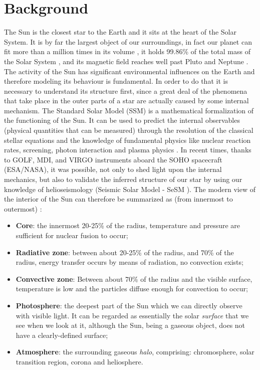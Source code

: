 \chapter{Background}
\label{capitolo2}
\thispagestyle{empty}


\noindent The Sun is the closest star to the Earth and it sits at the heart of the Solar System. It is by far the largest object of our surroundings, in fact our planet can fit more than a million times in its volume \cite{Laclare1996}, it holds 99.86\% of the total mass of the Solar System \cite{astro-const}, and its magnetic field reaches well past Pluto and Neptune \cite{nasa-sun-earth}. The activity of the Sun has significant environmental influences on the Earth and therefore modeling its behaviour is fundamental. In order to do that it is necessary to understand its structure first, since a great deal of the phenomena that take place in the outer parts of a star are actually caused by some internal mechanism.
\bigbreak
\noindent The Standard Solar Model (SSM) \cite{ssm} is a mathematical formalization of the functioning of the Sun. It can be used to predict the internal observables (physical quantities that can be measured) through the resolution of the classical stellar equations and the knowledge of fundamental physics like nuclear reaction rates, screening, photon interaction and plasma physics \cite{ssmb}. In recent times, thanks to GOLF, MDI, and VIRGO instruments aboard the SOHO \cite{soho} spacecraft (ESA/NASA), it was possible, not only to shed light upon the internal mechanics, but also to validate the inferred structure of our star by using our knowledge of helioseismology (Seismic Solar Model - SeSM \cite{sesm}).
\bigbreak
\noindent The modern view of the interior of the Sun can therefore be summarized as (from innermost to outermost) \cite{sstruct}:
\begin{itemize}
    \item \textbf{Core}: the innermost 20-25\% of the radius, temperature and pressure are sufficient for nuclear fusion to occur;
    \item  \textbf{Radiative zone}: between about 20-25\% of the radius, and 70\% of the radius, energy transfer occurs by means of radiation, no convection exists;
    \item \textbf{Convective zone}: Between about 70\% of the radius and the visible surface, temperature is low and the particles diffuse enough for convection to occur;
    \item \textbf{Photosphere}: the deepest part of the Sun which we can directly observe with visible light. It can be regarded as essentially the solar \textit{surface} that we see when we look at it, although the Sun, being a gaseous object, does not have a clearly-defined surface;
    \item \textbf{Atmosphere}: the surrounding gaseous \textit{halo}, comprising: chromosphere, solar transition region, corona and heliosphere.
\end{itemize}
